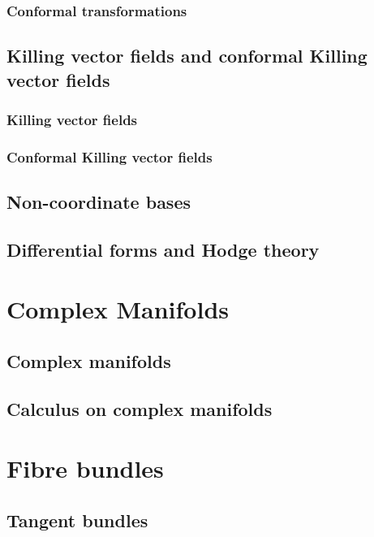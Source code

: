 \documentclass[twoside]{amsart}
\begin{document}
\subsubsection{ Conformal transformations }

\subsection{ Killing vector fields and conformal Killing vector fields }

\subsubsection{ Killing vector fields }

\subsubsection{ Conformal Killing vector fields }

\subsection{ Non-coordinate bases }

\subsection{ Differential forms and Hodge theory }




\section{Complex Manifolds}

\subsection{ Complex manifolds }

\subsection{ Calculus on complex manifolds }



\section{Fibre bundles}

\subsection{ Tangent bundles }
\end{document}
